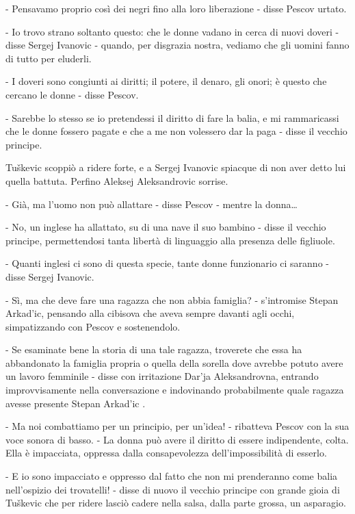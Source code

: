 - Pensavamo proprio così dei negri fino alla loro liberazione - disse Pescov urtato. 

- Io trovo strano soltanto questo: che le donne vadano in cerca di nuovi doveri - disse Sergej Ivanovic - quando, per disgrazia nostra, vediamo che gli uomini fanno di tutto per eluderli. 

- I doveri sono congiunti ai diritti; il potere, il denaro, gli onori; è questo che cercano le donne - disse Pescov. 

- Sarebbe lo stesso se io pretendessi il diritto di fare la balia, e mi rammaricassi che le donne fossero pagate e che a me non volessero dar la paga - disse il vecchio principe. 

Tuškevic scoppiò a ridere forte, e a Sergej Ivanovic spiacque di non aver detto lui quella battuta. Perfino Aleksej Aleksandrovic sorrise. 

- Già, ma l'uomo non può allattare - disse Pescov - mentre la donna\ldots{} 

- No, un inglese ha allattato, su di una nave il suo bambino - disse il vecchio principe, permettendosi tanta libertà di linguaggio alla presenza delle figliuole. 

- Quanti inglesi ci sono di questa specie, tante donne funzionario ci saranno - disse Sergej Ivanovic. 

- Sì, ma che deve fare una ragazza che non abbia famiglia? - s'intromise Stepan Arkad'ic, pensando alla cibisova che aveva sempre davanti agli occhi, simpatizzando con Pescov e sostenendolo. 

- Se esaminate bene la storia di una tale ragazza, troverete che essa ha abbandonato la famiglia propria o quella della sorella dove avrebbe potuto avere un lavoro femminile - disse con irritazione Dar'ja Aleksandrovna, entrando improvvisamente nella conversazione e indovinando probabilmente quale ragazza avesse presente Stepan Arkad'ic . 

- Ma noi combattiamo per un principio, per un'idea! - ribatteva Pescov con la sua voce sonora di basso. - La donna può avere il diritto di essere indipendente, colta. Ella è impacciata, oppressa dalla consapevolezza dell'impossibilità di esserlo. 

- E io sono impacciato e oppresso dal fatto che non mi prenderanno come balia nell'ospizio dei trovatelli! - disse di nuovo il vecchio principe con grande gioia di Tuškevic che per ridere lasciò cadere nella salsa, dalla parte grossa, un asparagio. 

\label{xi-3} 

